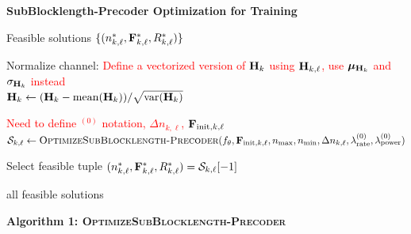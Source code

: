 \documentclass[a4paper, 12pt, onecolumn, journal, twoside, draftclsnofoot]{IEEEtran}
\begin{document}
\noindent\textbf{SubBlocklength-Precoder Optimization for Training }

\begin{algorithmic}[1]
\Ensure
Feasible solutions
$\{(n_{k,\ell}^*, {\bf F}_{k,\ell}^*, R_{k,\ell}^*)\}$

 

    \State Normalize channel:
    \textcolor{red}{Define a vectorized version of ${\bf H}_k$ using ${\bf H}_{k,\ell}$, use ${\boldsymbol \mu}_{{\bf H}_k}$ and $\sigma_{{\bf H}_k}$ instead} \\
    ${\bf H}_k \gets ({\bf H}_k - \mathrm{mean}({\bf H}_k)) / \sqrt{\mathrm{var}({\bf H}_k)}$

     
	
		
        \State
        \textcolor{red}{Need to define $^{(0)}$ notation, $\Delta n_{k,\ell}$, ${\bf F}_{\text{init},k,\ell}$ } \\
        $\mathcal{S}_{k,\ell}
        \gets
        \textsc{OptimizeSubBlocklength-Precoder}
        (f_\theta,
        {\bf F}_{\mathrm{init}, k, \ell},
        n_{\max},
        n_{\min},
        \Delta n_{k,\ell},
        \lambda_\text{rate}^{(0)},
        \lambda_\text{power}^{(0)})$

        \State Select feasible tuple
        $(n_{k,\ell}^*, {\bf F}_{k,\ell}^*, R_{k,\ell}^*)
        = \mathcal{S}_{k,\ell}[-1]$

    \EndFor
\EndFor

\State \Return all feasible solutions
\end{algorithmic}


\newpage


\noindent\textbf{Algorithm 1: \textsc{OptimizeSubBlocklength-Precoder}}
\end{document}
